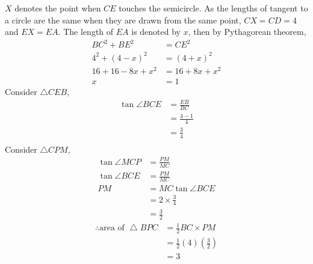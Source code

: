 \documentclass[varwidth=70mm]{standalone}
\begin{document}
\begin{answer}
$X$ denotes the point when $CE$ touches the semicircle. As the lengths of tangent to a circle are the same when they are drawn from the same point, $CX=CD=4$ and $EX=EA$. The length of $EA$ is denoted by $x$, then by Pythagorean theorem,
\begin{equation*}
\begin{aligned}
BC^2 + BE^2 &= CE^2 \\
4^2 + (4-x)^2 &= (4+x)^2 \\
16 + 16 - 8x + x^2 &= 16 + 8x + x^2 \\
x &= 1
\end{aligned}
\end{equation*}
Consider $\bigtriangleup CEB$,
\begin{equation*}
\begin{aligned}
\tan\angle BCE &= \frac{EB}{BC} \\
			   &= \frac{4-1}{4} \\
			   &= \frac{3}{4} \\
\end{aligned}
\end{equation*}
Consider $\bigtriangleup CPM$,
\begin{equation*}
\begin{aligned}
\tan\angle MCP &= \frac{PM}{MC} \\
\tan\angle BCE &= \frac{PM}{MC} \\
PM &= MC\tan\angle BCE \\
   &= 2\times\frac{3}{4} \\
   &= \frac{3}{2}
\end{aligned}
\end{equation*}
\begin{equation*}
\begin{aligned}
\therefore\text{area of }\bigtriangleup BPC &= \frac{1}{2}BC\times PM \\
		&= \frac{1}{2}\left(4\right)\left(\frac{3}{2}\right) \\
		&= 3
\end{aligned}
\end{equation*}

\end{answer}
\end{document}
